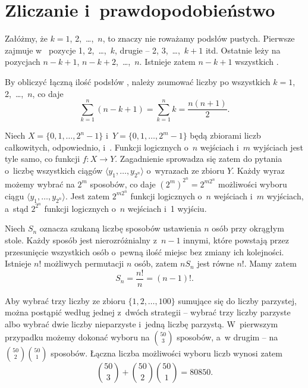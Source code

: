 \chapter{Zliczanie i~prawdopodobieństwo}


\exercise %
Załóżmy, że $k=1$, 2,~\dots,~$n$, to znaczy nie roważamy podsłów pustych. Pierwsze  zajmuje w~ pozycje 1, 2,~\dots,~$k$, drugie -- 2, 3,~\dots,~$k+1$ itd. Ostatnie  leży na pozycjach $n-k+1$, $n-k+2$,~\dots,~$n$. Istnieje zatem $n-k+1$ wszystkich  .

By obliczyć łączną ilość podsłów , należy zsumować liczby  po wszystkich $k=1$, 2,~\dots,~$n$, co daje
\[
	\sum_{k=1}^n(n-k+1) = \sum_{k=1}^nk = \frac{n(n+1)}{2}.
\]

\exercise %
Niech $X=\{0,1,\dots,2^n-1\}$ i~$Y=\{0,1,\dots,2^m-1\}$ będą zbiorami liczb całkowitych, odpowiednio,  i~. Funkcji logicznych o~$n$ wejściach i~$m$ wyjściach jest tyle samo, co funkcji $f\colon X\to Y$. Zagadnienie sprowadza się zatem do pytania o~liczbę wszystkich ciągów $\langle y_1,\dots,y_{2^n}\!\rangle$ o~wyrazach ze zbioru $Y$. Każdy wyraz możemy wybrać na $2^m$ sposobów, co daje $(2^m)^{2^n}=2^{m2^n}\!$ możliwości wyboru ciągu $\langle y_1,\dots,y_{2^n}\!\rangle$. Jest zatem $2^{m2^n}\!$ funkcji logicznych o~$n$ wejściach i~$m$ wyjściach, a~stąd $2^{2^n}\!$ funkcji logicznych o~$n$ wejściach i~1 wyjściu.

\exercise %
Niech $S_n$ oznacza szukaną liczbę sposobów ustawienia $n$ osób przy okrągłym stole. Każdy sposób jest nierozróżnialny z~$n-1$ innymi, które powstają przez przesunięcie wszystkich osób o~pewną ilość miejsc bez zmiany ich kolejności. Istnieje $n!$ możliwych permutacji $n$ osób, zatem $nS_n$ jest równe $n!$. Mamy zatem
\[
	S_n = \frac{n!}{n} = (n-1)!.
\]

\exercise %
Aby wybrać trzy liczby ze zbioru $\{1,2,\dots,100\}$ sumujące się do liczby parzystej, można postąpić według jednej z~dwóch strategii -- wybrać trzy liczby parzyste albo wybrać dwie liczby nieparzyste i~jedną liczbę parzystą. W~pierwszym przypadku możemy dokonać wyboru na $\binom{50}{3}$ sposobów, a~w drugim -- na $\binom{50}{2}\binom{50}{1}$ sposobów. Łączna liczba możliwości wyboru liczb wynosi zatem
\[
	\binom{50}{3}+\binom{50}{2}\binom{50}{1} = 80850.
\]


